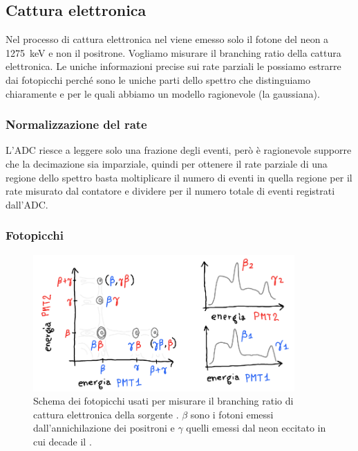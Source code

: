 \subsection{Cattura elettronica}

Nel processo di cattura elettronica nel \na{}
viene emesso solo il fotone del neon a \SI{1275}{keV} e non il positrone.
Vogliamo misurare il branching ratio della cattura elettronica.
Le uniche informazioni precise sui rate parziali le possiamo estrarre dai fotopicchi
perché sono le uniche parti dello spettro che distinguiamo chiaramente
e per le quali abbiamo un modello ragionevole (la gaussiana).

\subsubsection{Normalizzazione del rate}

L'ADC riesce a leggere solo una frazione degli eventi,
però è ragionevole supporre che la decimazione sia imparziale,
quindi per ottenere il rate parziale di una regione dello spettro
basta moltiplicare il numero di eventi in quella regione
per il rate misurato dal contatore
e dividere per il numero totale di eventi registrati dall'ADC.

\subsubsection{Fotopicchi}

\begin{figure}
	\centering
	\includegraphics[width=27em]{immagini/schemapicchi}
	\caption{\label{fig:schemapicchi}
	Schema dei fotopicchi usati per misurare il branching ratio di cattura elettronica della sorgente \na{}.
	$\beta$ sono i fotoni emessi dall'annichilazione dei positroni
	e $\gamma$ quelli emessi dal neon eccitato in cui decade il \na.}
\end{figure}

